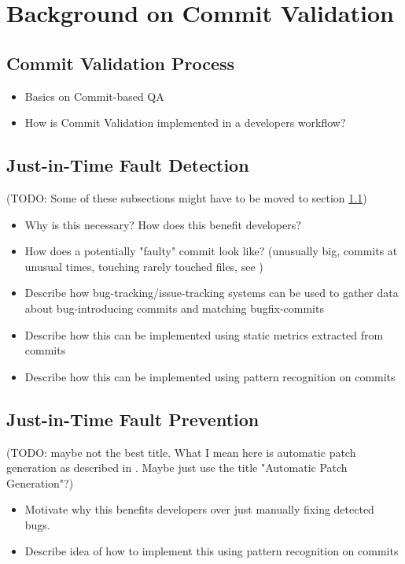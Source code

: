\section{Background on Commit Validation}

\subsection{Commit Validation Process}
\label{sec:cvprocess}
\begin{itemize}
	\item Basics on Commit-based QA
	\item How is Commit Validation implemented in a developers workflow?
\end{itemize}

\subsection{Just-in-Time Fault Detection}
(TODO: Some of these subsections might have to be moved to section \ref{sec:cvprocess})
\begin{itemize}
	\item Why is this necessary? How does this benefit developers?
	\item How does a potentially "faulty" commit look like? (unusually big, commits at unusual times, touching rarely touched files, see \cite{Goyal2017})
	\item Describe how bug-tracking/issue-tracking systems can be used to gather data about bug-introducing commits and matching bugfix-commits
	\item Describe how this can be implemented using static metrics extracted from commits
	\item Describe how this can be implemented using pattern recognition on commits
\end{itemize}

\subsection{Just-in-Time Fault Prevention}
(TODO: maybe not the best title. What I mean here is automatic patch generation as described in \cite{Nayrolles2018}. Maybe just use the title "Automatic Patch Generation"?)
\begin{itemize}
	\item Motivate why this benefits developers over just manually fixing detected bugs.
	\item Describe idea of how to implement this using pattern recognition on commits
\end{itemize}


